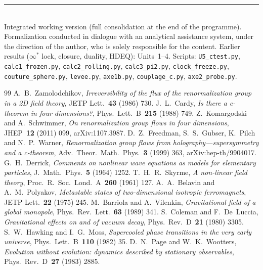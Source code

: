 \documentclass[11pt]{article}
\theoremstyle{definition}
\begin{document}
\bigskip
\noindent\rule{\textwidth}{0.3pt}\\
{\footnotesize Integrated working version (full consolidation at the end of the programme). Formalization
conducted in dialogue with an analytical assistance system, under the direction of the author, who is
solely responsible for the content. Earlier results ($\infty^\ast$ lock, closure, duality, HDEQ):
Units~1--4. Scripts: \texttt{U5\_ctest.py}, \texttt{calc1\_frozen.py}, \texttt{calc2\_rolling.py},
\texttt{calc3\_pi2.py}, \texttt{clock\_freeze.py}, \texttt{couture\_sphere.py}, \texttt{levee.py},
\texttt{axe1b.py}, \texttt{couplage\_c.py}, \texttt{axe2\_probe.py}.}

\renewcommand{\refname}{References}
\begin{thebibliography}{99}\small
{} A.~B.~Zamolodchikov, \emph{Irreversibility of the flux of the renormalization group in a 2D field theory}, JETP Lett.~\textbf{43} (1986) 730.
 J.~L.~Cardy, \emph{Is there a c-theorem in four dimensions?}, Phys.\ Lett.\ B~\textbf{215} (1988) 749.
 Z.~Komargodski and A.~Schwimmer, \emph{On renormalization group flows in four dimensions}, JHEP~\textbf{12} (2011) 099, arXiv:1107.3987.
 D.~Z.~Freedman, S.~S.~Gubser, K.~Pilch and N.~P.~Warner, \emph{Renormalization group flows from holography---supersymmetry and a c-theorem}, Adv.\ Theor.\ Math.\ Phys.~\textbf{3} (1999) 363, arXiv:hep-th/9904017.
 G.~H.~Derrick, \emph{Comments on nonlinear wave equations as models for elementary particles}, J.\ Math.\ Phys.~\textbf{5} (1964) 1252.
 T.~H.~R.~Skyrme, \emph{A non-linear field theory}, Proc.\ R.\ Soc.\ Lond.\ A~\textbf{260} (1961) 127.
 A.~A.~Belavin and A.~M.~Polyakov, \emph{Metastable states of two-dimensional isotropic ferromagnets}, JETP Lett.~\textbf{22} (1975) 245.
 M.~Barriola and A.~Vilenkin, \emph{Gravitational field of a global monopole}, Phys.\ Rev.\ Lett.~\textbf{63} (1989) 341.
 S.~Coleman and F.~De~Luccia, \emph{Gravitational effects on and of vacuum decay}, Phys.\ Rev.\ D~\textbf{21} (1980) 3305.
 S.~W.~Hawking and I.~G.~Moss, \emph{Supercooled phase transitions in the very early universe}, Phys.\ Lett.\ B~\textbf{110} (1982) 35.
 D.~N.~Page and W.~K.~Wootters, \emph{Evolution without evolution: dynamics described by stationary observables}, Phys.\ Rev.\ D~\textbf{27} (1983) 2885.

\end{thebibliography}
\end{document}
